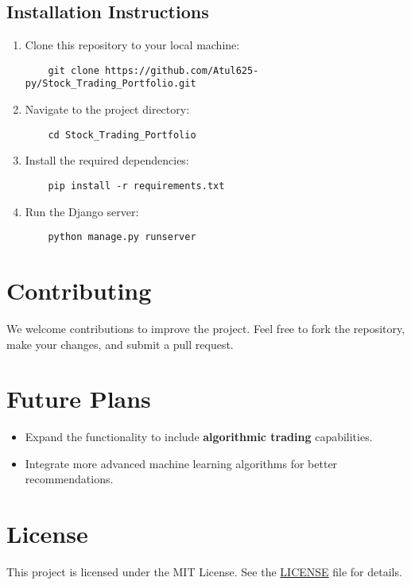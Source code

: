 \documentclass{article}
\begin{document}
\subsection*{Installation Instructions}
\begin{enumerate}
    \item Clone this repository to your local machine:
    \begin{verbatim}
    git clone https://github.com/Atul625-py/Stock_Trading_Portfolio.git
    \end{verbatim}

    \item Navigate to the project directory:
    \begin{verbatim}
    cd Stock_Trading_Portfolio
    \end{verbatim}

    \item Install the required dependencies:
    \begin{verbatim}
    pip install -r requirements.txt
    \end{verbatim}

    \item Run the Django server:
    \begin{verbatim}
    python manage.py runserver
    \end{verbatim}
\end{enumerate}

\section*{Contributing}

We welcome contributions to improve the project. Feel free to fork the repository, make your changes, and submit a pull request.

\section*{Future Plans}
\begin{itemize}
    \item Expand the functionality to include \textbf{algorithmic trading} capabilities.
    \item Integrate more advanced machine learning algorithms for better recommendations.
\end{itemize}

\section*{License}

This project is licensed under the MIT License. See the \href{LICENSE}{LICENSE} file for details.
\end{document}
